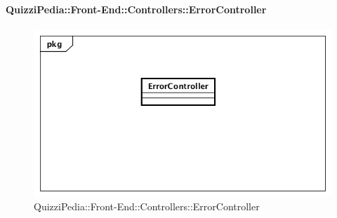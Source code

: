 \paragraph{QuizziPedia::Front-End::Controllers::ErrorController}
\begin{figure}
	\centering
	\includegraphics[scale=0.45]{UML/Classi/Front-End/QuizziPedia_Front-end_Controller_ErrorController.png}
	\caption{QuizziPedia::Front-End::Controllers::ErrorController}
\end{figure}
